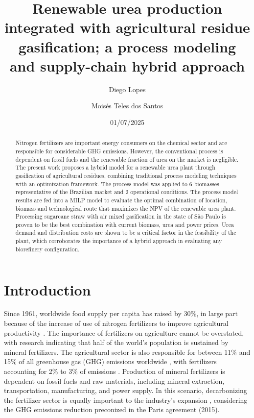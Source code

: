\documentclass[a4paper, titlepage]{article}
\begin{document}
\title{Renewable urea production integrated with agricultural residue gasification; a process modeling and
supply-chain hybrid approach}
\author{
	Diego Lopes\\
	\and
	Moisés Teles dos Santos}
\date{01/07/2025}
\maketitle

\begin{abstract}
Nitrogen fertilizers are important energy consumers on the chemical sector and are responsible for considerable GHG
emissions. However, the conventional process is dependent on fossil fuels and the renewable fraction of urea on the
market is negligible. The present work proposes a hybrid model for a renewable urea plant through gasification of
agricultural residues, combining traditional process modeling techniques with an optimization framework. The process
model was applied to 6 biomasses representative of the Brazilian market and 2 operational conditions. The process model
results are fed into a MILP model to evaluate the optimal combination of location, biomass and technological route that
maximizes the NPV of the renewable urea plant. Processing sugarcane straw with air mixed gasification in the state of
São Paulo is proven to be the best combination with current biomass, urea and power prices. Urea demand and 
distribution costs are shown to be a critical factor in the feasibility of the plant, which corroborates the importance
of a hybrid approach in evaluating any biorefinery configuration. 
\end{abstract}

\section{Introduction}

Since 1961, worldwide food supply per capita has raised by 30\%, in large part because of the increase of use of
nitrogen fertilizers to improve agricultural productivity \cite{mbowIPCCSpecialReport2019}. The importance of
fertilizers on agriculture cannot be overstated, with research indicating that half of the world’s population
is sustained by mineral fertilizers. The agricultural sector is also responsible for between 11\% and 15\% of
all greenhouse gas (GHG) emissions worldwide \cite{ifaEstimatingReportingFertilizerRelated2016}, with fertilizers
accounting for 2\% to 3\% of emissions \cite{brentrupCarbonFootprintAnalysis2016}. Production of mineral fertilizers
is dependent on fossil fuels and raw materials, including mineral extraction,
transportation, manufacturing, and power supply. In this scenario, decarbonizing the fertilizer sector is equally
important to the industry’s expansion \cite{ouikhalfanNetZeroEmissionFertilizers2022}, considering the GHG emissions
reduction preconized in the Paris agreement (2015).
\end{document}
